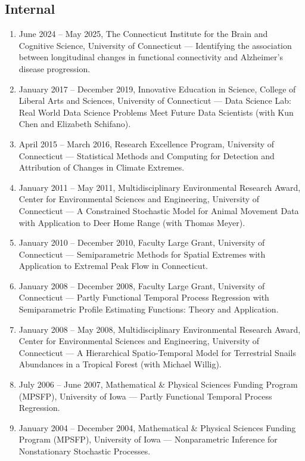 \documentclass[Statistics]{vita}
\begin{document}
\begin{vita}
  \subsection{Internal}
  \begin{enumerate}
  \item June 2024 -- May 2025, The Connecticut Institute for the Brain and Cognitive Science, University of Connecticut ---  Identifying the association between longitudinal changes in functional connectivity and Alzheimer's disease progression.
  \item January 2017 -- December 2019, Innovative Education in Science, College of Liberal Arts and Sciences, University of Connecticut --- Data Science Lab: Real World Data Science Problems Meet Future Data Scientists (with Kun Chen and Elizabeth Schifano).
  \item April 2015 -- March 2016, Research Excellence Program, University of Connecticut --- Statistical Methods and Computing for Detection and Attribution of Changes in Climate Extremes.
  \item January 2011 -- May 2011, Multidisciplinary Environmental Research Award, Center for Environmental Sciences and Engineering, University of Connecticut --- A Constrained Stochastic Model for Animal Movement Data with Application to Deer Home Range (with Thomas Meyer).
  \item January 2010 -- December 2010, Faculty Large Grant, University of Connecticut --- Semiparametric Methods for Spatial Extremes with Application to Extremal Peak Flow in Connecticut.
  \item January 2008 -- December 2008, Faculty Large Grant, University of Connecticut --- Partly Functional Temporal Process Regression with Semiparametric Profile Estimating Functions: Theory and Application.
  \item January 2008 -- May 2008, Multidisciplinary Environmental Research Award, Center for Environmental Sciences and Engineering, University of Connecticut --- A Hierarchical Spatio-Temporal Model for Terrestrial Snails Abundances in a Tropical Forest (with Michael Willig).
  \item July 2006 -- June 2007, Mathematical \& Physical Sciences Funding Program (MPSFP), University of Iowa --- Partly Functional Temporal Process Regression.
  \item January 2004 -- December 2004, Mathematical \& Physical Sciences Funding Program (MPSFP), University of Iowa --- Nonparametric Inference for Nonstationary Stochastic Processes.
  \end{enumerate}

\end{vita}
\end{document}
